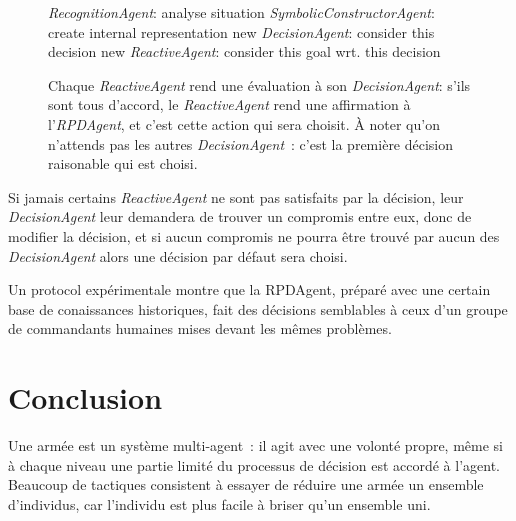 \documentclass{article}
\begin{document}
\begin{figure}[H]
\begin{minipage}[H]{0.55\linewidth}
\begin{algorithmic}[1]
\STATE \emph{RecognitionAgent}: analyse situation
\STATE \emph{SymbolicConstructorAgent}: create internal representation
\STATE new \emph{DecisionAgent}: consider this decision
\STATE new \emph{ReactiveAgent}: consider this goal wrt. this decision
\ENDFOR
\ENDFOR
\end{algorithmic}
Chaque \emph{ReactiveAgent} rend une évaluation à son \emph{DecisionAgent}: s'ils sont tous d'accord, le \emph{ReactiveAgent} rend une affirmation à l'\emph{RPDAgent}, et c'est cette action qui sera choisit. À noter qu'on n'attends pas les autres \emph{DecisionAgent}~: c'est la première décision raisonable qui est choisi.
\end{minipage}
\end{figure}
\cite{sokolowski2003}
Si jamais certains \emph{ReactiveAgent} ne sont pas satisfaits par la décision, leur \emph{DecisionAgent} leur demandera de trouver un compromis entre eux, donc de modifier la décision, et si aucun compromis ne pourra être trouvé par aucun des \emph{DecisionAgent} alors une décision par défaut sera choisi.

Un protocol expérimentale montre que la RPDAgent, préparé avec une certain base de conaissances historiques, fait des décisions semblables à ceux d'un groupe de commandants humaines mises devant les mêmes problèmes. 


\section{Conclusion}

Une armée est un système multi-agent~: il agit avec une volonté propre, même si à chaque niveau une partie limité du processus de décision est accordé à l'agent. Beaucoup de tactiques consistent à essayer de réduire une armée un ensemble d'individus, car l'individu est plus facile à briser qu'un ensemble uni.
\end{document}
